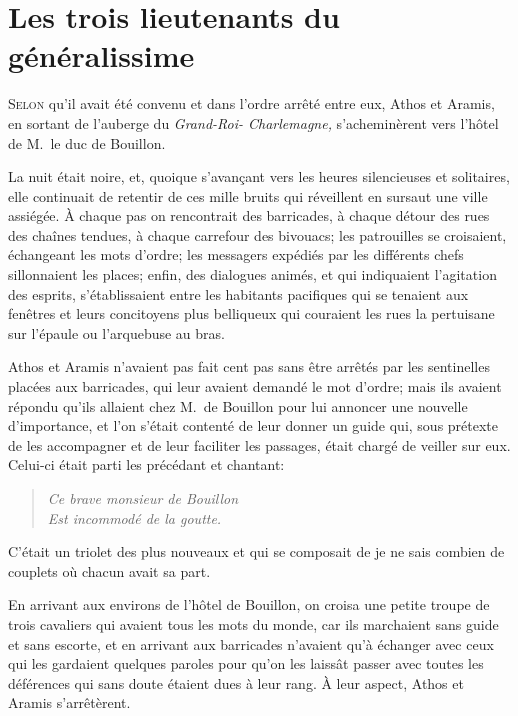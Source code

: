 \chapter{Les trois lieutenants du généralissime}

\lettrine{S}{elon} qu'il avait été convenu et dans l'ordre arrêté entre eux, Athos et Aramis, en sortant de l'auberge du \textit{Grand-Roi-
Charlemagne,} s'acheminèrent vers l'hôtel de M.~le duc de Bouillon.

\zz
La nuit était noire, et, quoique s'avançant vers les heures silencieuses et solitaires, elle continuait de retentir de ces mille bruits qui réveillent en sursaut une ville assiégée. À chaque pas on rencontrait des barricades, à chaque détour des rues des chaînes tendues, à chaque carrefour des bivouacs; les patrouilles se croisaient, échangeant les mots d'ordre; les messagers expédiés par les différents chefs sillonnaient les places; enfin, des dialogues animés, et qui indiquaient l'agitation des esprits, s'établissaient entre les habitants pacifiques qui se tenaient aux fenêtres et leurs concitoyens plus belliqueux qui couraient les rues la pertuisane sur l'épaule ou l'arquebuse au bras.

Athos et Aramis n'avaient pas fait cent pas sans être arrêtés par les sentinelles placées aux barricades, qui leur avaient demandé le mot d'ordre; mais ils avaient répondu qu'ils allaient chez M.~de Bouillon pour lui annoncer une nouvelle d'importance, et l'on s'était contenté de leur donner un guide qui, sous prétexte de les accompagner et de leur faciliter les passages, était chargé de veiller sur eux. Celui-ci était parti les précédant et chantant:

\begin{verse}\itshape
	Ce brave monsieur de Bouillon\\
	Est incommodé de la goutte.\\
\end{verse}

C'était un triolet des plus nouveaux et qui se composait de je ne sais combien de couplets où chacun avait sa part.

En arrivant aux environs de l'hôtel de Bouillon, on croisa une petite troupe de trois cavaliers qui avaient tous les mots du monde, car ils marchaient sans guide et sans escorte, et en arrivant aux barricades n'avaient qu'à échanger avec ceux qui les gardaient quelques paroles pour qu'on les laissât passer avec toutes les déférences qui sans doute étaient dues à leur rang. À leur aspect, Athos et Aramis s'arrêtèrent.

